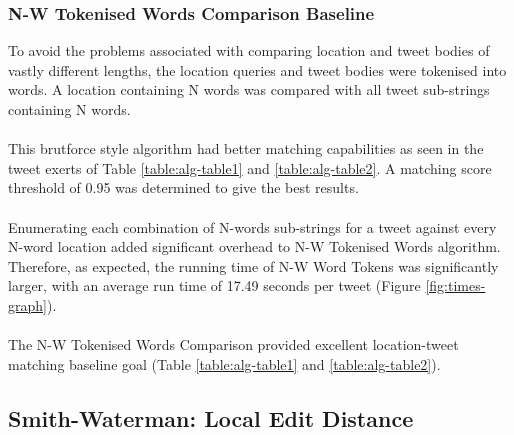 \documentclass[11pt,a4paper]{article}
\begin{document}


\subsubsection{N-W Tokenised Words Comparison Baseline}

To avoid the problems associated with comparing location and tweet bodies of vastly different lengths, the location queries and tweet bodies were tokenised into words. A location containing N words was compared with all tweet sub-strings containing N words.\\\\
This brutforce style algorithm had better matching capabilities as seen in the tweet exerts of Table \ref{table:alg-table1} and \ref{table:alg-table2}. A matching score threshold of 0.95 was determined to give the best results.\\\\ 
Enumerating each combination of N-words sub-strings for a tweet against every N-word location added significant overhead to N-W Tokenised Words algorithm. Therefore, as expected, the running time of N-W Word Tokens was significantly larger, with an average run time of 17.49 seconds per tweet (Figure \ref{fig:times-graph}).\\\\
The N-W Tokenised Words Comparison provided excellent location-tweet matching baseline goal (Table \ref{table:alg-table1} and \ref{table:alg-table2}).


\subsection{Smith-Waterman: Local Edit Distance}
\end{document}
